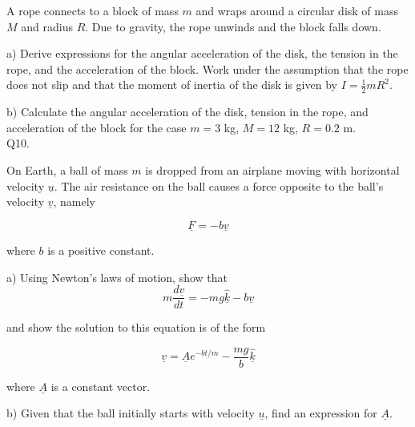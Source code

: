\documentclass[a4paper,11pt]{article}
\begin{document}
A rope connects to a block of mass \( m \) and wraps around a circular disk of mass \( M \) and radius \( R \). Due to gravity, the rope unwinds and the block falls down. 

\medskip

a) Derive expressions for the angular acceleration of the disk, the tension in the rope, and the acceleration of the block. Work under the assumption that the rope does not slip and that the moment of inertia of the disk is given by \( I = \frac{1}{2} m R^{2} \).

\medskip

b) Calculate the angular acceleration of the disk, tension in the rope, and acceleration of the block for the case \( m = 3 \) kg, \( M = 12 \) kg, \( R = 0.2 \) m. \\

Q10. 

On Earth, a ball of mass \( m \) is dropped from an airplane moving with horizontal velocity \( \underline{u} \). The air resistance on the ball causes a force opposite to the ball's velocity \( \underline{v} \), namely 

\[ \underline{F} = - b \underline{v} \] 

where \( b \) is a positive constant. 

\medskip

a) Using Newton's laws of motion, show that 
\[
m\frac{d\underline{v}}{dt} = - mg \hat{\underline{k}} - b\underline{v} 
\]

and show the solution to this equation is of the form 

\[
\underline{v} = \underline{A} e^{-bt/m} - \frac{mg}{b} \hat{\underline{k}} 
\]

where \( \underline{A} \) is a constant vector.

\medskip

b) Given that the ball initially starts with velocity \( \underline{u} \), find an expression for \( \underline{A} \).
\end{document}
